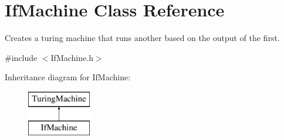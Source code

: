 \hypertarget{class_if_machine}{}\section{If\+Machine Class Reference}
\label{class_if_machine}


Creates a turing machine that runs another based on the output of the first.  




{\ttfamily \#include $<$If\+Machine.\+h$>$}

Inheritance diagram for If\+Machine\+:\begin{figure}[H]
\begin{center}
\leavevmode
\includegraphics[height=2.000000cm]{class_if_machine}
\end{center}
\end{figure}
